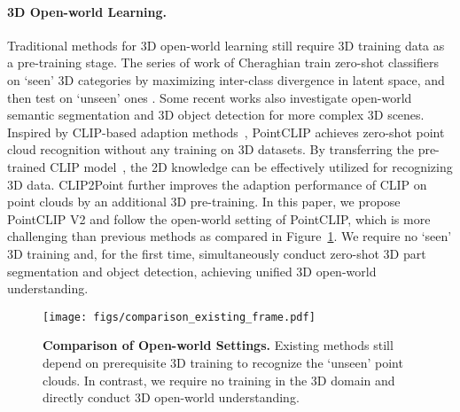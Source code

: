 \documentclass[10pt,twocolumn,letterpaper]{article}
\begin{document}
\paragraph{3D Open-world Learning.}
Traditional methods for 3D open-world learning still require 3D training data as a pre-training stage. The series of work of Cheraghian \etal train zero-shot classifiers on `seen' 3D categories by maximizing inter-class divergence in latent space, and then test on `unseen' ones \cite{cheraghian2019mitigating, cheraghian2019zero, cheraghian2022zero}. Some recent works \cite{michele2021generative,liu2021segmenting,naeem20223d, Lu2022Open} also investigate open-world semantic segmentation and 3D object detection for more complex 3D scenes.
Inspired by CLIP-based adaption methods~\cite{zhang2021tip,gao2021clip,lin2022frozen}, PointCLIP \cite{zhang2022pointclip} achieves zero-shot point cloud recognition without any training on 3D datasets. By transferring the pre-trained CLIP model~\cite{radford2021learning}, the 2D knowledge can be effectively utilized for recognizing 3D data. CLIP2Point \cite{Huang2022CLIP} further improves the adaption performance of CLIP on point clouds by an additional 3D pre-training.
In this paper, we propose PointCLIP V2 and follow the open-world setting of PointCLIP, which is more challenging than previous methods as compared in Figure~\ref{fig:scheme_comparison}.
We require no `seen' 3D training and, for the first time, simultaneously conduct zero-shot 3D part segmentation and object detection, achieving unified 3D open-world understanding.

\begin{figure}[t!]
\centering
\texttt{[image: figs/comparison\_existing\_frame.pdf]}
\vspace{0.07cm}
\caption{\textbf{Comparison of Open-world Settings.}
Existing methods still depend on prerequisite 3D training to recognize the `unseen' point clouds. In contrast, we require no training in the 3D domain and directly conduct 3D open-world understanding.}
\label{fig:scheme_comparison}
\vspace{-0.22cm}
\end{figure}
\end{document}

